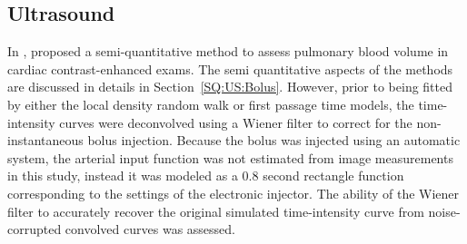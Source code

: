 \subsection{Ultrasound}
In \citeyear{Mischi:2004cn}, \citet{Mischi:2004cn} proposed a semi-quantitative method to assess pulmonary blood volume in cardiac contrast-enhanced exams.
The semi quantitative aspects of the methods are discussed in details in Section~\ref{SQ:US:Bolus}.
However, prior to being fitted by either the local density random walk or first passage time models, the time-intensity curves were deconvolved using a Wiener filter to correct for the non-instantaneous bolus injection.
Because the bolus was injected using an automatic system, the arterial input function was not estimated from image measurements in this study, instead it was modeled as a 0.8 second rectangle function corresponding to the settings of the electronic injector.
The ability of the Wiener filter to accurately recover the original simulated time-intensity curve from noise-corrupted convolved curves was assessed.


